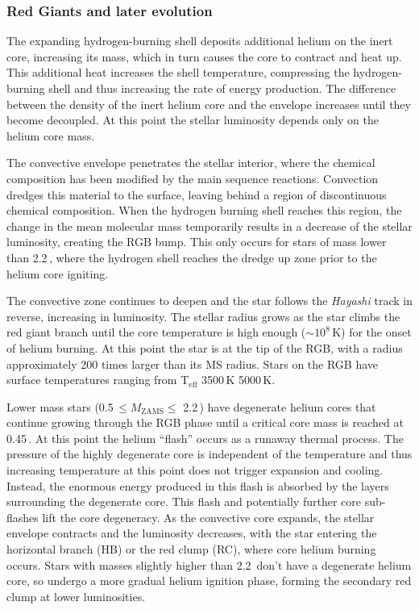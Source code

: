 \subsubsection{Red Giants and later evolution}

The expanding hydrogen-burning shell deposits additional helium on the inert core, increasing its mass, which in turn causes the core to contract and heat up. This additional heat increases the shell temperature, compressing the hydrogen-burning shell and thus increasing the rate of energy production. The difference between the density of the inert helium core and the envelope increases until they become decoupled. At this point the stellar luminosity depends only on the helium core mass.

The convective envelope penetrates the stellar interior, where the chemical composition has been modified by the main sequence reactions. Convection dredges this material to the surface, leaving behind a region of discontinuous chemical composition. When the hydrogen burning shell reaches this region, the change in the mean molecular mass temporarily results in a decrease of the stellar luminosity, creating the RGB bump. This only occurs for stars of mass lower than 2.2\,\Msol{}, where the hydrogen shell reaches the dredge up zone prior to the helium core igniting.

The convective zone continues to deepen and the star follows the {\em Hayashi} track in reverse, increasing in luminosity. The stellar radius grows as the star climbs the red giant branch until the core temperature is high enough ($\sim10^8$\,K) for the onset of helium burning. At this point the star is at the tip of the RGB, with a radius approximately 200 times larger than its MS radius. Stars on the RGB have surface temperatures ranging from T$_\mathrm{eff}$ \texttildelow{}3500\,K \textendash{} 5000\,K.

Lower mass stars (0.5\,\Msol$ \leq M_{\mathrm{ZAMS}} \leq $ 2.2\,\Msol{}) have degenerate helium cores that continue growing through the RGB phase until a critical core mass is reached at \texttildelow{}0.45\,\Msol{}. At this point the helium ``flash'' occurs as a runaway thermal process. The pressure of the highly degenerate core is independent of the temperature and thus increasing temperature at this point does not trigger expansion and cooling. Instead, the enormous energy produced in this flash is absorbed by the layers surrounding the degenerate core. This flash and potentially further core sub-flashes lift the core degeneracy. As the convective core expands, the stellar envelope contracts and the luminosity decreases, with the star entering the horizontal branch (HB) or the red clump (RC), where core helium burning occurs. Stars with masses slightly higher than 2.2\,\Msol{} don't have a degenerate helium core, so undergo a more gradual helium ignition phase, forming the secondary red clump at lower luminosities.


